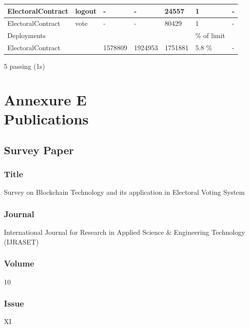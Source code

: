 \documentclass[oneside, 12pt]{book}
\begin{document}
{\begin{minipage}{\linewidth}
\begin{table}[H]
{\begin{tabular}{|ll|lllll|}
						\multicolumn{1}{|l|}{ElectoralContract} & logout            & \multicolumn{1}{l|}{-}       & \multicolumn{1}{l|}{-}       & \multicolumn{1}{l|}{24557}     & \multicolumn{1}{l|}{1}                 & -                  \\ \hline
						\multicolumn{1}{|l|}{ElectoralContract} & vote              & \multicolumn{1}{l|}{-}       & \multicolumn{1}{l|}{-}       & \multicolumn{1}{l|}{80429}     & \multicolumn{1}{l|}{1}                 & -                  \\ \hline
						\multicolumn{2}{|l|}{Deployments}                           & \multicolumn{3}{l|}{}                                                                        & \multicolumn{1}{l|}{\% of limit}       &                    \\ \hline
						\multicolumn{2}{|l|}{ElectoralContract}                     & \multicolumn{1}{l|}{1578809} & \multicolumn{1}{l|}{1924953} & \multicolumn{1}{l|}{1751881}   & \multicolumn{1}{l|}{5.8 \%}            & -                  \\ \hline
					\end{tabular}%
				}
			\end{table}
			5 passing (1s)
			\vspace*{2pt}
		\end{minipage}%
	}
	\newpage
	\section{Annexure E\\Publications}
	\newpage
		\subsection{Survey Paper}
			\subsubsection{Title}
				Survey on Blockchain Technology and its application in Electoral Voting System
			\subsubsection{Journal}
				International Journal for Research in Applied Science \& Engineering Technology (IJRASET)
			\subsubsection{Volume}
				10
			\subsubsection{Issue}
				XI
\end{document}
